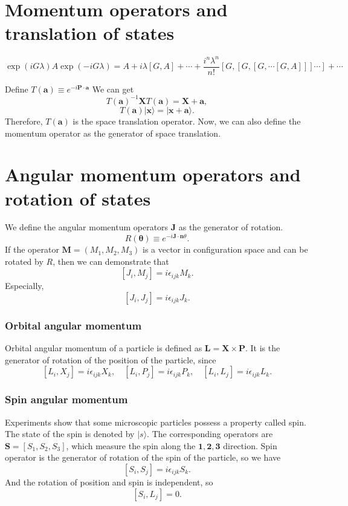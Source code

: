 \section{Momentum operators and translation of states}
\begin{newthem}
\[\exp(iG\lambda) A \exp(-iG\lambda) = A + i\lambda[G,A] + \cdots + \frac{i^n\lambda^n}{n!}[G,[G,[G,\cdots[G,A]]]\cdots]+\cdots \]
\end{newthem}
\noindent
Define $T(\bm{a}) \equiv e^{-i\bm{P \cdot a}}$
We can get
\[T(\bm{a})^{-1} \bm{X} T(\bm{a}) = \bm{X} + \bm{a},\]
\[T(\bm{a})|\bm{x}\rangle = |\bm{x}+\bm{a}\rangle.\]
Therefore, $T(\bm{a})$ is the space translation operator. 
Now, we can also define the momentum operator as the generator of space translation.

\section{Angular momentum operators and rotation of states}
\noindent
We define the angular momentum operators $\bm{J}$ as the generator of rotation.
\[R(\bm{\theta}) \equiv e^{-i\bm{J} \cdot \bm{n} \theta}.\]
If the operator $\bm{M} = (M_1,M_2,M_3)$ is a vector in configuration space and can be rotated by $R$, then we can demonstrate that
\[[J_{i},M_{j}] = i \epsilon_{ijk}M_k.\]
Especially, 
\[[J_i,J_j] = i\epsilon_{ijk}J_k.\]

\subsubsection{Orbital angular momentum}
\noindent
Orbital angular momentum of a particle is defined as $\bm{L} = \bm{X} \times \bm{P}$. It is the generator of rotation of the position of the particle, since
\[[L_i,X_j] = i\epsilon_{ijk}X_k , \quad [L_i,P_j] = i\epsilon_{ijk}P_k , \quad [L_i,L_j] = i\epsilon_{ijk}L_k.\]

\subsubsection{Spin angular momentum}
\noindent
Experiments show that some microscopic particles possess a property called spin. The state of the spin is denoted by $|s\rangle$. The corresponding operators are $\bm{S} = [S_1,S_2,S_3]$, which measure the spin along the $\bm{1},\bm{2},\bm{3}$ direction. Spin operator is the generator of rotation of the spin of the particle, so we have
\[[S_i,S_j]=i\epsilon_{ijk}S_k.\]
And the rotation of position and spin is independent, so
\[[S_i,L_j] = 0.\]

